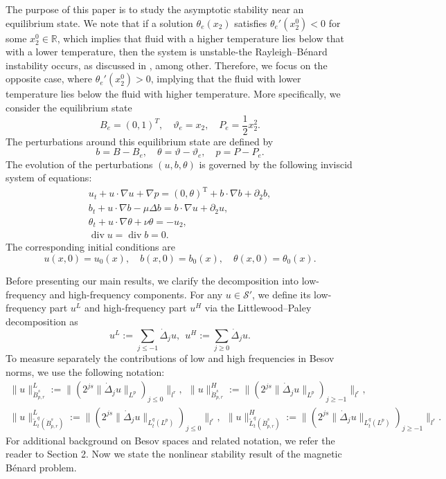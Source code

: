 \documentclass[10pt,a4paper]{amsart}
\numberwithin{equation}{section}
\begin{document}
The purpose of this paper is to study the asymptotic stability near an equilibrium state.
We note that if a solution $\theta_e(x_2)$ satisfies $\theta_e'(x_2^0)<0$ for some
$x_2^0\in\mathbb{R}$, which implies that fluid with a higher temperature lies below that with a lower temperature, then the system is unstable-the Rayleigh--B\'enard instability occurs, as discussed
in \cite{MR128226,MR2098531,MR4134456}, among other. Therefore, we focus on the opposite case, where $\theta_e'(x_2^0)>0$, implying that the fluid with lower temperature lies below the fluid with
higher temperature. More specifically, we consider the equilibrium state
$$
{B}_e=(0,1)^T,\quad \vartheta_e=x_2,\quad
 P_e=\frac{1}{2}x_2^2.
 $$
 The perturbations around this equilibrium state are defined by
\begin{equation*}
 b=B-{B}_e,\quad \theta=\vartheta-\vartheta_e,\quad p=P-P_e.
\end{equation*}
The evolution of the perturbations $(u,b,\theta)$ is governed by the following inviscid system of
equations:
\begin{equation}\label{1.2}
\begin{gathered}
 u_t+ u\cdot \nabla u+\nabla p= (0,\theta)^\mathrm{T}+ b\cdot \nabla b+\partial_2b,\\
 b_t+u\cdot\nabla b-\mu\Delta b=b\cdot\nabla u+\partial_2u,\\
 \theta_t+u\cdot \nabla \theta+\nu\theta=-u_2,\\
 \operatorname{div} u=\operatorname{div} b=0.
\end{gathered}
\end{equation}
 The corresponding initial conditions are
 \begin{equation} \label{1.1.2}
 u(x,0)=u_0(x),\quad b(x,0)=b_0(x),\quad \theta(x,0)=\theta_0(x).
 \end{equation}

 Before presenting our main results, we clarify the decomposition into low-frequency and high-frequency
 components. For any $u\in\mathcal{S}'$, we define its low-frequency part $u^{L}$ and high-frequency
 part $u^{H}$ via the Littlewood--Paley decomposition as
\[
 u^L:=\sum_{j\leqslant-1}\dot{\Delta}_ju,\ \ u^H:=\sum_{j\geqslant 0}\dot{\Delta}_ju.
\]
To measure separately the contributions of low and high frequencies in Besov norms, we use the following notation:
\begin{gather*}
\|u\|_{\dot{B}^{s}_{p,r}}^L:=\|(2^{js}\|\dot{\Delta}_ju\|_{L^p})_{j\leqslant 0}\|_{l^r},\ \ \|u\|_{\dot{B}^{s}_{p,r}}^H:=\|(2^{js}\|\dot{\Delta}_ju\|_{L^p})_{j\geqslant -1}\|_{l^r},\\
\|u\|_{\tilde{L}^q_t(\dot{B}^s_{p,r})}^L:=\|(2^{js}\|\dot{\Delta}_ju\|_{L^q_t(L^p)})_{j\leqslant 0}\|_{l^r},\ \ \|u\|_{\tilde{L}^q_t(\dot{B}^s_{p,r})}^H:=\|(2^{js}\|\dot{\Delta}_ju\|_{L^q_t(L^p)})_{j\geqslant -1}\|_{l^r}.
\end{gather*}
For additional background on Besov spaces and related notation, we refer the reader to Section 2.
Now we state the nonlinear stability result of the magnetic B\'enard problem.
\end{document}
